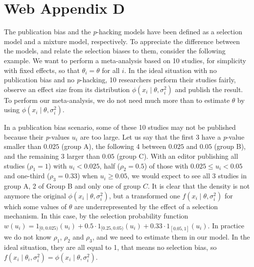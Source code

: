 \section*{Web Appendix D}

The publication bias and the \textit{p}-hacking models have been defined as a selection model and a mixture model, respectively. To appreciate the difference between the models, and relate the selection biases to them, consider the following example. We want to perform a meta-analysis based on 10 studies, for simplicity with fixed effects, so that $\theta_i = \theta$ for all $i$. In the ideal situation with no publication bias and no \textit{p}-hacking, 10 researchers perform their studies fairly, observe an effect size from its distribution $\phi(x_{i}\mid\theta,\sigma^2_{i})$ and publish the result. To perform our meta-analysis, we do not need much more than to estimate $\theta$ by using $\phi(x_{i}\mid\theta,\sigma^2_{i})$.

In a publication bias scenario, some of these 10 studies may not be published because their \textit{p}-values $u_i$ are too large. Let us say that the first 3 have a \textit{p}-value smaller than $0.025$ (group A), the following 4 between $0.025$ and $0.05$ (group B), and the remaining 3 larger than $0.05$ (group C). With an editor publishing all studies ($\rho_{1} = 1$) with $u_i < 0.025$, half ($\rho_{2} = 0.5$) of those with $0.025 \leq u_i < 0.05$ and one-third ($\rho_{3} = 0.33$) when $u_i \geq 0.05$, we would expect to see all 3 studies in group A, 2 of Group B and only one of group $C$. It is clear that the density is not anymore the original $\phi(x_{i}\mid\theta,\sigma^2_{i})$, but a transformed one $f(x_{i}\mid\theta,\sigma^2_{i})$ for which some values of $\theta$ are underrepresented by the effect of a selection mechanism. In this case, by the selection probability function $w(u_i) = 1_{[0,0.025)}(u_i) + 0.5 \cdot 1_{[0.25,0.05)}(u_i) + 0.33 \cdot 1_{[0.05, 1]}(u_i)$. In practice we do not know $\rho_{1}$, $\rho_{2}$ and $\rho_{3}$, and we need to estimate them in our model. In the ideal situation, they are all equal to 1, that means no selection bias, so $f(x_{i}\mid\theta_{i},\sigma^2_{i}) = \phi(x_{i}\mid\theta,\sigma^2_{i})$.

